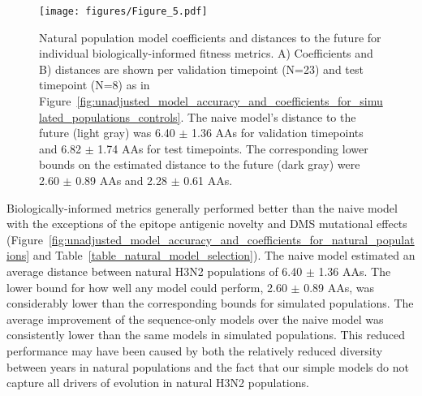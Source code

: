 \begin{figure}[htb]
  \texttt{[image: figures/Figure\_5.pdf]}
  \caption{
    Natural population model coefficients and distances to the future for individual biologically-informed fitness metrics.
    A) Coefficients and B) distances are shown per validation timepoint (N=23) and test timepoint (N=8) as in Figure~\ref{fig:unadjusted_model_accuracy_and_coefficients_for_simulated_populations_controls}.
    The naive model's distance to the future (light gray) was 6.40 $\pm$ 1.36 AAs for validation timepoints and 6.82 $\pm$ 1.74 AAs for test timepoints.
    The corresponding lower bounds on the estimated distance to the future (dark gray) were 2.60 $\pm$ 0.89 AAs and 2.28 $\pm$ 0.61 AAs.
  }
  \label{fig:unadjusted_model_accuracy_and_coefficients_for_natural_populations}

  \label{figsupp:unadjusted_composite_model_accuracy_and_coefficients_for_natural_populations_epitope_vs_oracle}

\end{figure}

Biologically-informed metrics generally performed better than the naive model with the exceptions of the epitope antigenic novelty and DMS mutational effects (Figure~\ref{fig:unadjusted_model_accuracy_and_coefficients_for_natural_populations} and Table~\ref{table_natural_model_selection}).
The naive model estimated an average distance between natural H3N2 populations of 6.40 $\pm$ 1.36 AAs.
The lower bound for how well any model could perform, 2.60 $\pm$ 0.89 AAs, was considerably lower than the corresponding bounds for simulated populations.
The average improvement of the sequence-only models over the naive model was consistently lower than the same models in simulated populations.
This reduced performance may have been caused by both the relatively reduced diversity between years in natural populations and the fact that our simple models do not capture all drivers of evolution in natural H3N2 populations.

